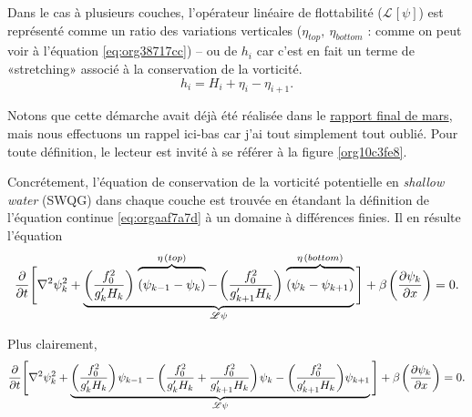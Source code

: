 \documentclass[10pt]{report}
\numberwithin{equation}{section}
\newcommand{\grande}{\vphantom{\frac{1}{xx}}}
\newcommand{\pt}{\hspace{1pt}} %
\begin{document}
Dans le cas à plusieurs couches, l'opérateur linéaire de flottabilité (\(\mathscr{L}\pt[\psi]\)) est représenté comme un ratio des variations verticales (\(\eta_{top},\ \eta_{bottom}\) : comme on peut voir à l'équation \ref{eq:org38717cc}) -- ou de \(h_i\) car c'est en fait un terme de «stretching» associé à la conservation de la vorticité.
\begin{equation}
   h_i = H_i + \eta_i - \eta_{i+1}.
\end{equation}

Notons que cette démarche avait déjà été réalisée dans le \href{rapport-2023-03-31.pdf}{rapport final de mars}, mais nous effectuons un rappel ici-bas car j'ai tout simplement tout oublié.
Pour toute définition, le lecteur est invité à se référer à la figure \ref{org10c3fe8}. \bigskip

Concrétement, l'équation de conservation de la vorticité potentielle en \emph{shallow water} (SWQG) dans chaque couche \autocite[p.186]{vallis_2006} est trouvée en étandant la définition de l'équation continue \ref{eq:orgaaf7a7d} à un domaine à différences finies.
Il en résulte l'équation
\begin{equation}
\label{eq:org38717cc}
   \pdv{}{t} \Bigg[ \laplacian{\psi^2_k} + \underbrace{\qty(\frac{f_0^2}{g_k' H_k})\pt \overbrace{\qty(\psi_{k-1}-\psi_k)\grande}^{\eta\pt(top)} -\pt \qty(\frac{f_0^2}{g_{k+1}' H_k})\pt \overbrace{\qty(\psi_{k} - \psi_{k+1})\grande}^{\eta\pt(bottom)}}_{\mathscr{L \psi}} \Bigg] + \beta\pt \qty(\pdv{\psi_k}{x}) = 0.
\end{equation}

Plus clairement,
\begin{equation}
   \pdv{}{t} \Bigg[ \laplacian{\psi^2_k} + \underbrace{\qty(\frac{f_0^2}{g_k' H_k})\pt \psi_{k-1} - \qty(\frac{f_0^2}{g_k' H_k} + \frac{f_0^2}{g_{k+1}' H_k}) \pt \psi_{k} - \qty(\frac{f_0^2}{g_{k+1}' H_k})\psi_{k+1}}_\mathscr{L\psi} \Bigg] + \beta\pt \qty(\pdv{\psi_k}{x}) = 0.
\end{equation}
\end{document}
